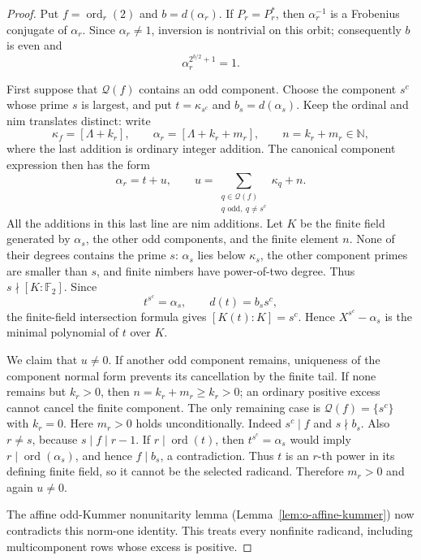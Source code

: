 \documentclass[11pt]{article}
\theoremstyle{definition}
\theoremstyle{remark}
\begin{document}
\begin{proof}
Put $f=\operatorname{ord}_r(2)$ and $b=d(\alpha_r)$.
If $P_r=P_r^*$, then $\alpha_r^{-1}$ is a Frobenius conjugate of
$\alpha_r$.  Since $\alpha_r\ne1$, inversion is nontrivial on this
orbit; consequently $b$ is even and
\[
 \alpha_r^{2^{b/2}+1}=1.
\]

First suppose that $\mathcal Q(f)$ contains an odd component.
Choose the component $s^c$ whose prime $s$ is largest, and put
$t=\kappa_{s^c}$ and $b_s=d(\alpha_s)$.
Keep the ordinal and nim translates distinct: write
\[
 \kappa_f=[\Lambda+k_r],\qquad
 \alpha_r=[\Lambda+k_r+m_r],\qquad n=k_r+m_r\in\mathbb N,
\]
where the last addition is ordinary integer addition.  The canonical
component expression then has the form
\[
 \alpha_r=t+u,\qquad
 u=\sum_{\substack{q\in\mathcal Q(f)\\
                    q\text{ odd},\ q\ne s^c}}\kappa_q+n.
\]
All the additions in this last line are nim additions.  Let $K$ be the
finite field generated by $\alpha_s$, the other odd components, and the
finite element $n$.  None of their degrees contains the prime $s$:
$\alpha_s$ lies below $\kappa_s$, the other component primes are smaller
than $s$, and finite nimbers have power-of-two degree.  Thus $s\nmid[K:
\mathbb F_2]$.  Since
\[
 t^{s^c}=\alpha_s,\qquad d(t)=b_s s^c,
\]
the finite-field intersection formula gives $[K(t):K]=s^c$.
Hence $X^{s^c}-\alpha_s$ is the minimal polynomial of $t$ over $K$.

We claim that $u\ne0$.  If another odd component remains, uniqueness of
the component normal form prevents its cancellation by the finite tail.
If none remains but $k_r>0$, then $n=k_r+m_r\geq k_r>0$; an ordinary
positive excess cannot cancel the finite component.
The only remaining case is $\mathcal Q(f)=\{s^c\}$ with $k_r=0$.
Here $m_r>0$ holds unconditionally.  Indeed $s^c\mid f$ and $s\nmid b_s$.
Also $r\ne s$, because $s\mid f\mid r-1$.  If
$r\mid\operatorname{ord}(t)$, then $t^{s^c}=\alpha_s$ would imply
$r\mid\operatorname{ord}(\alpha_s)$, and hence $f\mid b_s$, a
contradiction.  Thus $t$ is an $r$-th power in its defining finite field,
so it cannot be the selected radicand.  Therefore $m_r>0$ and again
$u\ne0$.

The affine odd-Kummer nonunitarity lemma
(Lemma~\ref{lem:o-affine-kummer}) now contradicts
this norm-one identity.  This treats every nonfinite
radicand, including multicomponent rows whose excess is positive.


\end{proof}
\end{document}
